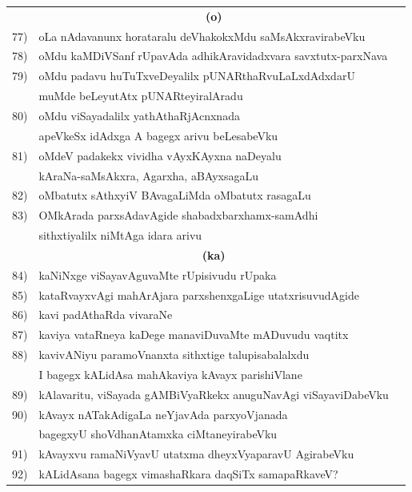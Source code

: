 {\begin{longtable}{@{}cp{7.4cm}r}
    &  \multicolumn{1}{c}{\bf(o)} & \\[0.3cm]  
77) & oLa nAdavanunx horataralu deVhakokxMdu saMsAkxravirabeVku &  \pageref{page130}\\
78) & oMdu kaMDiVSanf rUpavAda adhikAravidadxvara savxtutx-parxNava & \pageref{page140}\\
79) & oMdu padavu huTuTxveDeyalilx pUNARthaRvuLaLxdAdxdarU  & \\ 
    & muMde beLeyutAtx pUNARteyiralAradu &  \pageref{page177}\\
80) & oMdu viSayadalilx yathAthaRjAcnxnada  & \\
    & apeVkeSx idAdxga A bagegx arivu beLesabeVku &  \pageref{page200}\\
81) & oMdeV padakekx vividha vAyxKAyxna naDeyalu  & \\
    & kAraNa-saMsAkxra, Agarxha, aBAyxsagaLu  & \pageref{page212}\\ 
82) & oMbatutx sAthxyiV BAvagaLiMda oMbatutx rasagaLu & \pageref{page230}\\ 
83) & OMkArada parxsAdavAgide shabadxbarxhamx-samAdhi & \\
    & sithxtiyalilx niMtAga idara arivu & \pageref{page203}\\
    &  \multicolumn{1}{c}{\bf(ka)} & \\[0.3cm]
84) & kaNiNxge viSayavAguvaMte rUpisivudu rUpaka & \pageref{page241}\\
85) & kataRvayxvAgi mahArAjara parxshenxgaLige utatxrisuvudAgide & \pageref{page250}\\
86)  & kavi padAthaRda vivaraNe & \pageref{page184}\\
87) & kaviya vataRneya kaDege manaviDuvaMte mADuvudu vaqtitx & \pageref{page245}\\
88) & kavivANiyu paramoVnanxta sithxtige talupisabalalxdu & \\
    & I bagegx kALidAsa mahAkaviya kAvayx parishiVlane & \pageref{page232}\\    
89) & kAlavaritu, viSayada gAMBiVyaRkekx anuguNavAgi viSayaviDabeVku & \pageref{page250}\\
90) & kAvayx nATakAdigaLa neYjavAda parxyoVjanada   & \\
    & bagegxyU shoVdhanAtamxka ciMtaneyirabeVku & \pageref{page233} \\
91) & kAvayxvu ramaNiVyavU utatxma dheyxVyaparavU AgirabeVku & \pageref{page244}\\
92) & kALidAsana bagegx vimashaRkara daqSiTx samapaRkaveV? & \pageref{page233} \\

\end{longtable}}

